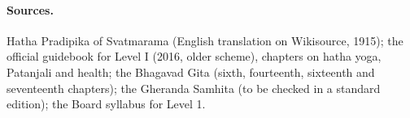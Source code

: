 \paragraph{Sources.} Hatha Pradipika of Svatmarama (English translation on Wikisource, 1915); the official guidebook for Level I (2016, older scheme), chapters on hatha yoga, Patanjali and health; the Bhagavad Gita (sixth, fourteenth, sixteenth and seventeenth chapters); the Gheranda Samhita (to be checked in a standard edition); the Board syllabus for Level 1.
